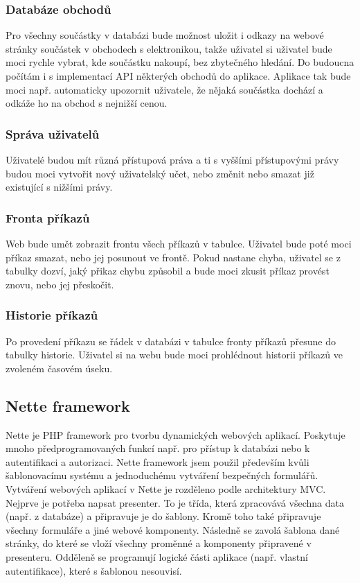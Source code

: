 \documentclass[12pt, a4paper, oneside]{article}
\begin{document}
\subsubsection{Databáze obchodů}

Pro všechny součástky v databázi bude možnost uložit i odkazy na webové stránky součástek v obchodech s elektronikou, takže uživatel si uživatel bude moci rychle vybrat, kde součástku nakoupí, bez zbytečného hledání.
Do budoucna počítám i s implementací API některých obchodů do aplikace. Aplikace tak bude moci např. automaticky upozornit uživatele, že nějaká součástka dochází a odkáže ho na obchod s nejnižší cenou.

\subsubsection{Správa uživatelů}

Uživatelé budou mít různá přístupová práva a ti s vyššími přístupovými právy budou moci vytvořit nový uživatelský učet, nebo změnit nebo smazat již existující s nižšími právy.

\subsubsection{Fronta příkazů}

Web bude umět zobrazit frontu všech příkazů v tabulce. Uživatel bude poté moci příkaz smazat, nebo jej posunout ve frontě. Pokud nastane chyba, uživatel se z tabulky dozví, jaký přikaz chybu způsobil a bude moci zkusit příkaz provést znovu,
nebo jej přeskočit.

\subsubsection{Historie příkazů}

Po provedení příkazu se řádek v databázi v tabulce fronty příkazů přesune do tabulky historie. Uživatel si na webu bude moci prohlédnout historii příkazů ve zvoleném časovém úseku.

\subsection{Nette framework}

Nette je PHP framework pro tvorbu dynamických webových aplikací. Poskytuje mnoho předprogramovaných funkcí např. pro přístup k databázi nebo k autentifikaci a autorizaci.
Nette framework jsem použil především kvůli šablonovacímu systému a jednoduchému vytváření bezpečných formulářů. Vytváření webových aplikací v Nette je rozděleno podle architektury MVC. Nejprve je potřeba napsat presenter. To je třída, která zpracovává všechna data (např. z databáze) a připravuje je do šablony. Kromě toho také připravuje všechny formuláře a jiné webové komponenty. Následně se zavolá šablona dané stránky, do které se vloží všechny proměnné a komponenty připravené v presenteru. Odděleně se programují logické části aplikace (např. vlastní autentifikace), které s šablonou nesouvisí.
\end{document}

